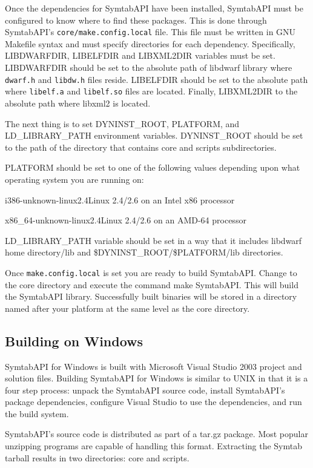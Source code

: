 Once the dependencies for SymtabAPI have been installed, SymtabAPI must be
configured to know where to find these packages. This is done through
SymtabAPI's \texttt{core/make.config.local} file. This file must be written in
GNU Makefile syntax and must specify directories for each dependency.
Specifically, LIBDWARFDIR, LIBELFDIR and LIBXML2DIR variables must be set.
LIBDWARFDIR should be set to the absolute path of libdwarf library where
\texttt{dwarf.h} and \texttt{libdw.h} files reside. LIBELFDIR should be set
to the absolute path where \texttt{libelf.a} and \texttt{libelf.so} files are
located. Finally, LIBXML2DIR to the absolute path where libxml2 is located.

The next thing is to set DYNINST\_ROOT, PLATFORM, and LD\_LIBRARY\_PATH
environment variables. DYNINST\_ROOT should be set to the path of the directory
that contains core and scripts subdirectories.

PLATFORM should be set to one of the following values depending upon what operating system you are running on:
\begin{description}
    \item i386-unknown-linux2.4Linux 2.4/2.6 on an Intel x86 processor
    \item x86\_64-unknown-linux2.4Linux 2.4/2.6 on an AMD-64 processor
\end{description}

LD\_LIBRARY\_PATH variable should be set in a way that it includes libdwarf home
directory/lib and \${DYNINST\_ROOT}/\${PLATFORM}/lib directories.

Once \texttt{make.config.local} is set you are ready to build SymtabAPI. Change
to the core directory and execute the command make SymtabAPI. This will build
the SymtabAPI library. Successfully built binaries will be stored in a directory
named after your platform at the same level as the core directory. 

\subsection{Building on Windows}

SymtabAPI for Windows is built with Microsoft Visual Studio 2003 project and
solution files.   Building SymtabAPI for Windows is similar to UNIX in that it
is a four step process: unpack the SymtabAPI source code, install SymtabAPI's
package dependencies, configure Visual Studio to use the dependencies, and run
the build system. 

SymtabAPI's source code is distributed as part of a tar.gz package. Most popular
unzipping programs are capable of handling this format. Extracting the Symtab
tarball results in two directories: core and scripts. 


